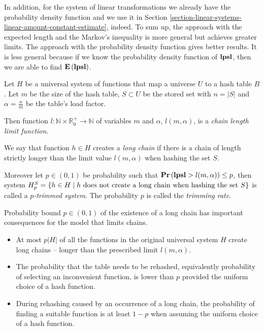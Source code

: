 In addition, for the system of linear transformations we already have the probability density function and  we use it in Section \ref{section-linear-systems-linear-amount-constant-estimate}, indeed. To sum up, the approach with the expected length and the Markov's inequality is more general but achieves greater limits. The approach with the probability density function gives better results. It is less general because if we know the probability density function of $\mathbf{lpsl}$, then we are able to find $\mathbf{E}\left(\mathbf{lpsl}\right)$.

\begin{definition}
Let $H$ be a universal system of functions that map a universe $U$ to a hash table $B$. Let $m$ be the size of the hash table, $S \subset U$ be the stored set with $n = |S|$ and $\alpha = \frac{n}{m}$ be the table's load factor. 

Then function $l: \mathbb{N} \times \mathbb{R}_{0}^{+} \rightarrow \mathbb{N}$ of variables $m$ and $\alpha$, $l(m, \alpha)$, is a \emph{chain length limit function}. 

We say that function $h \in H$ creates a \emph{long chain} if there is a chain of length strictly longer than the limit value $l(m, \alpha)$ when hashing the set $S$.

Moreover let $p \in (0, 1)$ be probability such that $\mathbf{Pr}\left(\mathbf{lpsl} > l(m, \alpha)\right) \leq p$, then system $H_p^S = \{ h \in H \mid h \text{ does not create a long chain when hashing the set $S$} \}$ is called a \emph{$p$-trimmed system}. The probability $p$ is called the \emph{trimming rate}.
\end{definition}

Probability bound $p \in (0, 1)$ of the existence of a long chain has important consequences for the model that limits chains.
\begin{itemize}
\item At most $p|H|$ of all the functions in the original universal system $H$ create long chains -- longer than the prescribed limit $l(m, \alpha)$. 
\item The probability that the table needs to be rehashed, equivalently probability of selecting an inconvenient function, is lower than $p$ provided the uniform choice of a hash function.
\item During rehashing caused by an occurrence of a long chain, the probability of finding a suitable function is at least $1 - p$ when assuming the uniform choice of a hash function.
\end{itemize}

